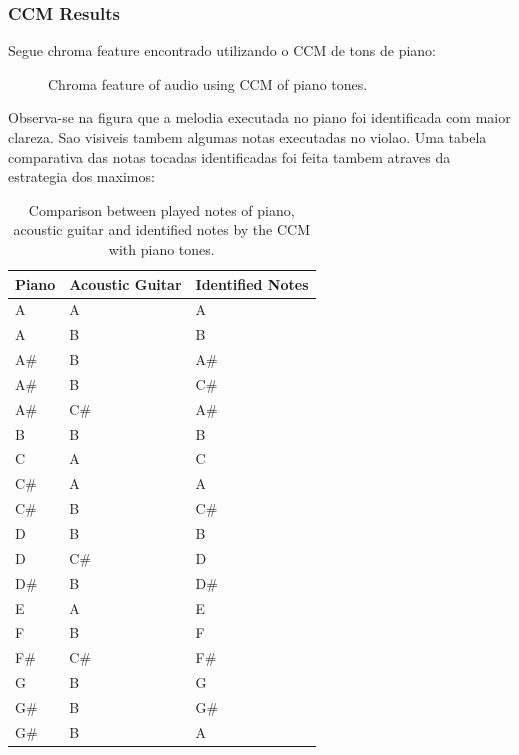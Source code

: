 \documentclass{article}
\begin{document}
	\subsubsection{CCM Results}
	Segue chroma feature encontrado utilizando o CCM de tons de piano:
	
	\begin{figure}[h]
	 \centerline{}
	 \caption{Chroma feature of audio using CCM of piano tones.}
	 \label{fig:2-ccm-piano}
	\end{figure}	

	Observa-se na figura  que a melodia executada no piano foi identificada com maior clareza. Sao visiveis tambem algumas notas executadas no violao. Uma tabela comparativa das notas tocadas identificadas foi feita tambem atraves da estrategia dos maximos:

	\begin{table}[h]
	 \begin{center}
	 \begin{tabular}{|l|l|l|}
	  \hline
	  Piano & Acoustic Guitar & Identified Notes \\
	  \hline
		A	& A	& A \\
		A	&    B	&    B \\
		A\#	&    B	&    A\# \\
		A\#	&    B	&    C\# \\
		A\#	&    C\#	&    A\# \\
		B	&    B	&    B \\
		C	&    A	&    C \\
		C\#	&    A	&    A \\
		C\#	&    B	&    C\# \\
		D	&    B	&    B \\
		D	&    C\#	&    D \\
		D\#	&    B	&    D\# \\
		E	&    A	&    E \\
		F	&    B	&    F \\
		F\#	&    C\#	&    F\# \\
		G	&    B	&    G \\
		G\#	&    B	&    G\# \\
		G\#	&    B	&    A \\
	  \hline
	 \end{tabular}
	\end{center}
	 \caption{Comparison between played notes of piano, acoustic guitar and identified notes by the CCM with piano tones.}
	 \label{tab:table-2-ccm-piano}
	\end{table}
\end{document}
